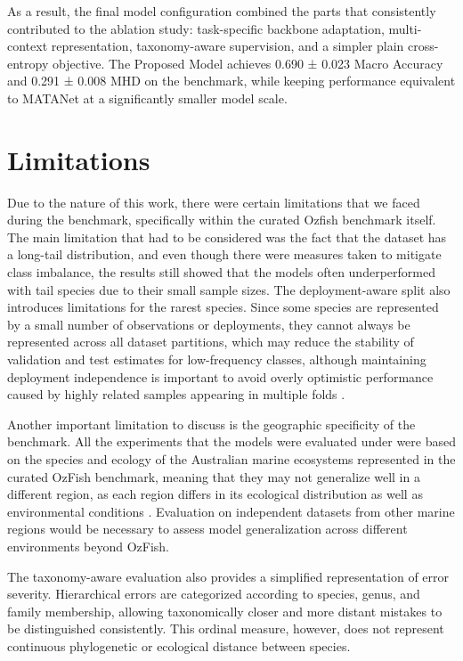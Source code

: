 \documentclass[preprint,12pt]{elsarticle}
\begin{document}
As a result, the final model configuration combined the parts that
consistently contributed to the ablation study: task-specific backbone
adaptation, multi-context representation, taxonomy-aware supervision,
and a simpler plain cross-entropy objective. The Proposed Model achieves
0.690 ± 0.023 Macro Accuracy and 0.291 ± 0.008 MHD on the benchmark,
while keeping performance equivalent to MATANet at a significantly
smaller model scale.

\section{Limitations}\label{limitations}

Due to the nature of this work, there were certain limitations that we
faced during the benchmark, specifically within the curated Ozfish
benchmark itself. The main limitation that had to be considered was the
fact that the dataset has a long-tail distribution, and even though
there were measures taken to mitigate class imbalance, the results still
showed that the models often underperformed with tail species due to
their small sample sizes. The deployment-aware split also introduces
limitations for the rarest species. Since some species are represented
by a small number of observations or deployments, they cannot always be
represented across all dataset partitions, which may reduce the
stability of validation and test estimates for low-frequency classes,
although maintaining deployment independence is important to avoid
overly optimistic performance caused by highly related samples appearing
in multiple folds \citep{ref17,ref20}.

Another important limitation to discuss is the geographic specificity of
the benchmark. All the experiments that the models were evaluated under
were based on the species and ecology of the Australian marine
ecosystems represented in the curated OzFish benchmark, meaning that
they may not generalize well in a different region, as each region
differs in its ecological distribution as well as environmental
conditions \citep{ref13,ref18}. Evaluation on independent datasets
from other marine regions would be necessary to assess model
generalization across different environments beyond OzFish.

The taxonomy-aware evaluation also provides a simplified representation
of error severity. Hierarchical errors are categorized according to
species, genus, and family membership, allowing taxonomically closer and
more distant mistakes to be distinguished consistently. This ordinal
measure, however, does not represent continuous phylogenetic or
ecological distance between species.
\end{document}
